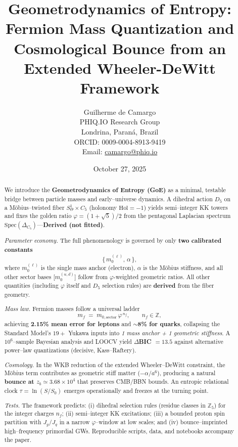 \documentclass[12pt]{article}
\title{Geometrodynamics of Entropy: Fermion Mass Quantization and Cosmological Bounce from an Extended Wheeler-DeWitt Framework}
\author{Guilherme de Camargo\\
PHIQ.IO Research Group\\
Londrina, Paraná, Brazil\\
ORCID: 0009-0004-8913-9419\\
Email: \href{mailto:camargo@phiq.io}{camargo@phiq.io}}
\date{October 27, 2025}
\newcommand{\Moebius}{M\"obius}
\newcommand{\SigMoeb}{\Sigma\text{--}\Moebius}
\begin{document}
\maketitle

\begin{abstract}
We introduce the \textbf{Geometrodynamics of Entropy (GoE)} as a minimal, testable bridge between particle masses and early--universe dynamics. A dihedral action $D_5$ on a \Moebius{}--twisted fiber $S^1_\Theta \times C_5$ (holonomy $\mathrm{Hol}=-1$) yields semi--integer KK towers and fixes the golden ratio $\varphi=(1+\sqrt{5})/2$ from the pentagonal Laplacian spectrum $\mathrm{Spec}(\Delta_{C_5})$—\textbf{Derived (not fitted)}.

\textit{Parameter economy.} The full phenomenology is governed by only \textbf{two calibrated constants}
\[
\{\,m_{0}^{(\ell)},\,\alpha\,\},
\]
where $m_0^{(\ell)}$ is the single mass anchor (electron), $\alpha$ is the \SigMoeb{} stiffness, and all other sector bases [$m_0^{(u,d)}$] follow from $\varphi$-weighted geometric ratios. All other quantities (including $\varphi$ itself and $D_5$ selection rules) are \textbf{derived} from the fiber geometry.

\textit{Mass law.} Fermion masses follow a universal ladder
\[
m_f \;=\; m_{0,\text{sector}}\,\varphi^{\,n_f},\qquad n_f\in\mathbb{Z},
\]
achieving \textbf{2.15\% mean error for leptons} and \textbf{$\sim$8\% for quarks}, collapsing the Standard Model's $19{+}$ Yukawa inputs into \textit{1 mass anchor + 1 geometric stiffness}. A $10^6$–sample Bayesian analysis and LOOCV yield \textbf{$\Delta$BIC $=13.5$} against alternative power–law quantizations (decisive, Kass--Raftery).

\textit{Cosmology.} In the WKB reduction of the extended Wheeler--DeWitt constraint, the \SigMoeb{} term contributes as geometric stiff matter ($-\alpha/a^6$), producing a natural \textbf{bounce at $z_b\simeq3.68\times10^4$} that preserves CMB/BBN bounds. An entropic relational clock $\tau=\ln(S/S_0)$ emerges operationally and freezes at the turning point.

\textit{Tests.} The framework predicts: (i) dihedral selection rules (residue classes in $\mathbb{Z}_5$) for the integer charges $n_f$; (ii) semi--integer KK excitations; (iii) a bounded proton spin partition with $J_g/J_q$ in a narrow $\varphi$–window at low scales; and (iv) bounce–imprinted high–frequency primordial GWs. Reproducible scripts, data, and notebooks accompany the paper.
\end{abstract}
\end{document}
